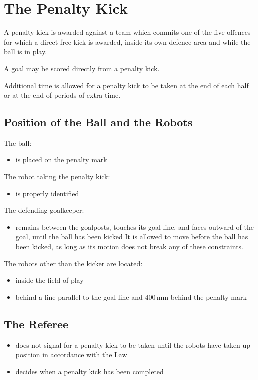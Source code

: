 \section{The Penalty Kick}\label{sec:penalty-kick}

A penalty kick is awarded against a team which commits one of the five offences for which a direct free kick is awarded, inside its own defence area and while the ball is in play.

A goal may be scored directly from a penalty kick.

Additional time is allowed for a penalty kick to be taken at the end of each half or at the end of periods of extra time.

\subsection{Position of the Ball and the Robots}
The ball:

\begin{itemize}
\item is placed on the penalty mark
\end{itemize}

The robot taking the penalty kick:

\begin{itemize}
\item is properly identified
\end{itemize}

The defending goalkeeper:

\begin{itemize}
\item remains between the goalposts, touches its goal line, and faces outward of the goal, until the ball has been kicked
It is allowed to move before the ball has been kicked, as long as its motion does not break any of these constraints.
\end{itemize}

The robots other than the kicker are located:

\begin{itemize}
\item inside the field of play
\item behind a line parallel to the goal line and 400\,mm behind the penalty mark
\end{itemize}

\subsection{The Referee}
\begin{itemize}
\item does not signal for a penalty kick to be taken until the robots have taken up position in accordance with the Law
\item decides when a penalty kick has been completed
\end{itemize}

